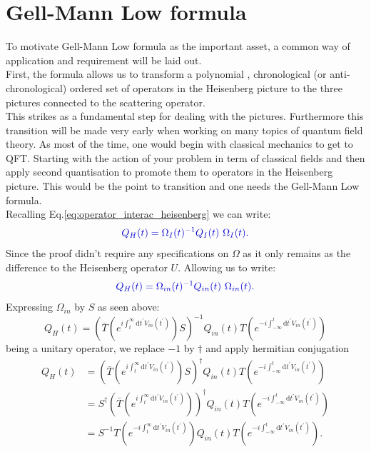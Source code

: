 \documentclass[12pt, titlepage]{article}
\begin{document}
\section{Gell-Mann Low formula}
%
To motivate Gell-Mann Low formula as the important asset, a common way of application and requirement will be laid out. \\
First, the formula allows us to transform a polynomial , chronological (or anti-chronological) ordered set of operators in the Heisenberg picture to  the three pictures connected to the scattering operator. \\
This strikes as a fundamental step for dealing with the pictures. Furthermore this transition will be made very early when working on many topics of quantum field theory. As most of the time, one would begin with classical mechanics to get to QFT. Starting with the action of your problem in term of classical fields and then apply second quantisation to promote them to operators in the Heisenberg picture. This would be the point to transition and one needs the Gell-Mann Low formula.\\
%
Recalling Eq.\enskip\eqref{eq:operator_interac_heisenberg} we can write:
\begin{equation}\textcolor[RGB]{0,0,204}{
Q_{H}(t)=\Omega_{I}(t)^{-1}Q_{I}(t)\ \Omega_{I}(t).
}
\end{equation}
Since the proof didn't require any specifications on $ \Omega $ as it only remains as the difference to the Heisenberg operator $ U $. Allowing us to write:
\begin{equation}\textcolor[RGB]{0,0,204}{
Q_{H}(t)=\Omega_{in}(t)^{-1}Q_{in}(t)\ \Omega_{in}(t).
}
\end{equation}
Expressing $ \Omega_{in} $ by $ S $ as seen above:
\begin{equation}
Q_{H}(t)
=\left( 
\bar{T}
\left( 
 e^{i\int_{t}^{\infty}\mathrm{d}t^{\prime} V_{in}(t^{\prime})}
\right) 
S
\right)^{-1}
Q_{in}(t)
T
\left( 
 e^{-i\int_{-\infty}^{t}\mathrm{d}t^{\prime} V_{in}(t^{\prime})}
\right) 
\end{equation}
being a unitary operator, we replace $ -1 $ by $ \dagger $ and apply hermitian conjugation
\begin{subequations}
\begin{align}
Q_{H}(t)
&=\left( 
\bar{T}
\left( 
 e^{i\int_{t}^{\infty}\mathrm{d}t^{\prime} V_{in}(t^{\prime})}
\right) 
S
\right)^{\dagger}
Q_{in}(t)
T
\left( 
 e^{-i\int_{-\infty}^{t}\mathrm{d}t^{\prime} V_{in}(t^{\prime})}
\right) 
\\
&=
S^{\dagger}\left( 
\bar{T}
\left( 
 e^{i\int_{t}^{\infty}\mathrm{d}t^{\prime} V_{in}(t^{\prime})}
\right) 
\right)^{\dagger}
Q_{in}(t)
T
\left( 
 e^{-i\int_{-\infty}^{t}\mathrm{d}t^{\prime} V_{in}(t^{\prime})}
\right) 
\\
&=
S^{-1} 
T
\left( 
 e^{-i\int_{t}^{\infty}\mathrm{d}t^{\prime} V_{in}(t^{\prime})}
\right)
Q_{in}(t)
T
\left( 
 e^{-i\int_{-\infty}^{t}\mathrm{d}t^{\prime} V_{in}(t^{\prime})}
\right) .
\end{align}
\end{subequations}
\end{document}
